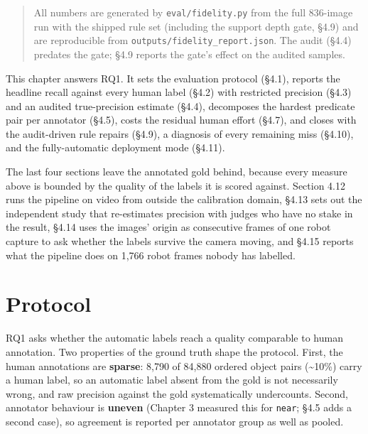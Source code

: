 
\begin{quote}
All numbers are generated by \texttt{eval/fidelity.py} from the full 836-image run with the shipped rule set (including the support depth gate, \S4.9) and are reproducible from \texttt{outputs/fidelity\_report.json}. The audit (\S4.4) predates the gate; \S4.9 reports the gate's effect on the audited samples.
\end{quote}

This chapter answers RQ1. It sets the evaluation protocol (\S4.1), reports the headline recall against every human label (\S4.2) with restricted precision (\S4.3) and an audited true-precision estimate (\S4.4), decomposes the hardest predicate pair per annotator (\S4.5), costs the residual human effort (\S4.7), and closes with the audit-driven rule repairs (\S4.9), a diagnosis of every remaining miss (\S4.10), and the fully-automatic deployment mode (\S4.11).

The last four sections leave the annotated gold behind, because every measure above is bounded by the quality of the labels it is scored against. Section 4.12 runs the pipeline on video from outside the calibration domain, \S4.13 sets out the independent study that re-estimates precision with judges who have no stake in the result, \S4.14 uses the images' origin as consecutive frames of one robot capture to ask whether the labels survive the camera moving, and \S4.15 reports what the pipeline does on 1,766 robot frames nobody has labelled.

\section{Protocol}

RQ1 asks whether the automatic labels reach a quality comparable to human annotation. Two properties of the ground truth shape the protocol. First, the human annotations are \textbf{sparse}: 8,790 of 84,880 ordered object pairs (\textasciitilde{}10\%) carry a human label, so an automatic label absent from the gold is not necessarily wrong, and raw precision against the gold systematically undercounts. Second, annotator behaviour is \textbf{uneven} (Chapter 3 measured this for \texttt{near}; \S4.5 adds a second case), so agreement is reported per annotator group as well as pooled.

